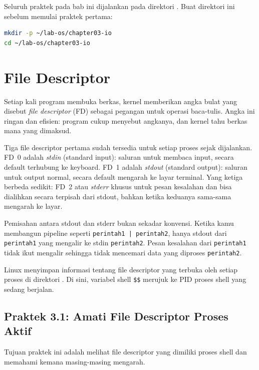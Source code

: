 \begin{notebox}
Seluruh praktek pada bab ini dijalankan pada direktori .
Buat direktori ini sebelum memulai praktek pertama:
\begin{lstlisting}[language=bash]
mkdir -p ~/lab-os/chapter03-io
cd ~/lab-os/chapter03-io
\end{lstlisting}
\end{notebox}

\section{File Descriptor}
\label{sec:file-descriptors}

Setiap kali program membuka berkas, kernel memberikan angka bulat yang disebut \textit{file descriptor} (FD) sebagai pegangan untuk operasi baca-tulis. Angka ini ringan dan efisien: program cukup menyebut angkanya, dan kernel tahu berkas mana yang dimaksud.

Tiga file descriptor pertama sudah tersedia untuk setiap proses sejak dijalankan. FD~0
adalah \textit{stdin} (standard input): saluran untuk membaca input, secara default
terhubung ke keyboard. FD~1 adalah \textit{stdout} (standard output): saluran untuk
output normal, secara default mengarah ke layar terminal. Yang ketiga berbeda sedikit:
FD~2 atau \textit{stderr} khusus untuk pesan kesalahan dan bisa dialihkan secara
terpisah dari stdout, bahkan ketika keduanya sama-sama mengarah ke layar.

Pemisahan antara stdout dan stderr bukan sekadar konvensi. Ketika kamu membangun pipeline seperti \texttt{perintah1 | perintah2}, hanya stdout dari \texttt{perintah1} yang mengalir ke stdin \texttt{perintah2}. Pesan kesalahan dari \texttt{perintah1} tidak ikut mengalir sehingga tidak mencemari data yang diproses \texttt{perintah2}.

Linux menyimpan informasi tentang file descriptor yang terbuka oleh setiap proses di direktori . Di sini, variabel shell \texttt{\$\$} merujuk ke PID proses shell yang sedang berjalan.

\subsection*{Praktek 3.1: Amati File Descriptor Proses Aktif}

Tujuan praktek ini adalah melihat file descriptor yang dimiliki proses shell dan memahami kemana masing-masing mengarah.


